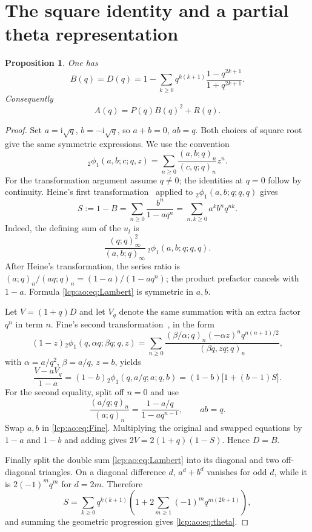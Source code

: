 \documentclass[11pt]{article}
\numberwithin{equation}{section}
\newtheorem{proposition}[theorem]{Proposition}
\theoremstyle{definition}\newtheorem{definition}[theorem]{Definition}
\theoremstyle{remark}\newtheorem{remark}[theorem]{Remark}
\newcommand{\ii}{\mathrm i}%
\begin{document}
\section{The square identity and a partial theta representation}\label{lcp:ao:sec:square}
\begin{proposition}\label{lcp:ao:prop:square}
One has
\begin{equation}\label{lcp:ao:eq:theta}
 B(q)=D(q)=1-\sum_{k\ge0}q^{k(k+1)}\frac{1-q^{2k+1}}{1+q^{2k+1}}.
\end{equation}
Consequently
\begin{equation}\label{lcp:ao:eq:exactmain}
 A(q)=P(q)B(q)^2+R(q).
\end{equation}
\end{proposition}
\begin{proof}
Set $a=\ii\sqrt q$, $b=-\ii\sqrt q$, so $a+b=0$, $ab=q$. Both choices of square root give the same symmetric expressions. We use the convention
\[
{}_2\phi_1(a,b;c;q,z)=\sum_{n\ge0}\frac{(a,b;q)_n}{(c,q;q)_n}z^n.
\]
For the transformation argument assume $q\ne0$; the identities at $q=0$ follow by continuity.
Heine's first transformation~\cite[17.6.6]{lcp-ao-dlmf} applied to ${}_2\phi_1(a,b;q;q,q)$ gives
\begin{equation}\label{lcp:ao:eq:Lambert}
 S:=1-B=\sum_{n\ge0}\frac{b^n}{1-aq^n}
 =\sum_{n,k\ge0}a^k b^nq^{nk}.
\end{equation}
Indeed, the defining sum of the $u_l$ is
\[
\frac{(q;q)_\infty^2}{(a,b;q)_\infty}\,{}_2\phi_1(a,b;q;q,q).
\]
After Heine's transformation, the series ratio is $(a;q)_n/(aq;q)_n=(1-a)/(1-aq^n)$; the product prefactor cancels with $1-a$. Formula \eqref{lcp:ao:eq:Lambert} is symmetric in $a,b$.

Let $V=(1+q)D$ and let $V_q$ denote the same summation with an extra factor $q^n$ in term $n$. Fine's second transformation~\cite[17.6.10]{lcp-ao-dlmf}, in the form
\[
(1-z){}_2\phi_1(q,\alpha q;\beta q;q,z)
=\sum_{n\ge0}\frac{(\beta/\alpha;q)_n(-\alpha z)^nq^{n(n+1)/2}}
 {(\beta q,zq;q)_n},
\]
with $\alpha=a/q^2$, $\beta=a/q$, $z=b$, yields
\begin{equation}\label{lcp:ao:eq:Fine}
\frac{V-aV_q}{1-a}=(1-b){}_2\phi_1(q,a/q;a;q,b)
=(1-b)\bigl[1+(b-1)S\bigr].
\end{equation}
For the second equality, split off $n=0$ and use
\[
\frac{(a/q;q)_n}{(a;q)_n}=\frac{1-a/q}{1-aq^{n-1}},\qquad ab=q.
\]
Swap $a,b$ in \eqref{lcp:ao:eq:Fine}. Multiplying the original and swapped equations by $1-a$ and $1-b$ and adding gives $2V=2(1+q)(1-S)$. Hence $D=B$.

Finally split the double sum \eqref{lcp:ao:eq:Lambert} into its diagonal and two off-diagonal triangles. On a diagonal difference $d$, $a^d+b^d$ vanishes for odd $d$, while it is $2(-1)^m q^m$ for $d=2m$. Therefore
\[
S=\sum_{k\ge0}q^{k(k+1)}\left(1+2\sum_{m\ge1}(-1)^mq^{m(2k+1)}\right),
\]
and summing the geometric progression gives \eqref{lcp:ao:eq:theta}.
\end{proof}
\end{document}
